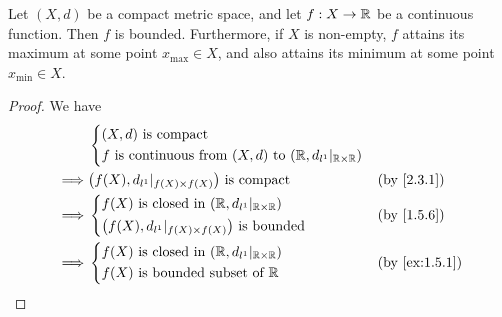 \begin{prop}\label{2.3.2}
  Let \((X, d)\) be a compact metric space, and let \(f : X \to \mathbb{R}\) be a continuous function.
  Then \(f\) is bounded.
  Furthermore, if \(X\) is non-empty, \(f\) attains its maximum at some point \(x_{\max} \in X\), and also attains its minimum at some point \(x_{\min} \in X\).
\end{prop}

\begin{proof}
  We have
  \begin{align*}
             & \begin{dcases}
                 (X, d) \text{ is compact} \\
                 f \text{ is continuous from } (X, d) \text{ to } (\R, d_{l^1}|_{\R \times \R})
               \end{dcases}                  \\
    \implies & \big(f(X), d_{l^1}|_{f(X) \times f(X)}\big) \text{ is compact}                 &  & \by{2.3.1} \\
    \implies & \begin{dcases}
                 f(X) \text{ is closed in } (\R, d_{l^1}|_{\R \times \R}) \\
                 \big(f(X), d_{l^1}|_{f(X) \times f(X)}\big) \text{ is bounded}
               \end{dcases}                 &  & \by{1.5.6}                                  \\
    \implies & \begin{dcases}
                 f(X) \text{ is closed in } (\R, d_{l^1}|_{\R \times \R}) \\
                 f(X) \text{ is bounded subset of } \R
               \end{dcases}                    &  & \by{ex:1.5.1}
  \end{align*}


\end{proof}

